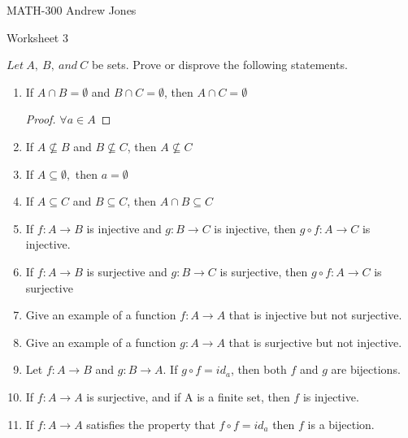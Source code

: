 \documentclass{article}
\begin{document}
  MATH-300 \hfill Andrew Jones
  \begin{center}
  {\huge Worksheet 3}
  \end{center}
  $Let\ A,\ B,\ and\ C$ be sets. Prove or disprove the following statements. \\
  \begin{enumerate}
  \item If $A\cap B = \emptyset$ and $B\cap C = \emptyset$, then $A\cap C = \emptyset$
    \begin{proof}
$\forall a\in A$
    \end{proof}
  \item If $A\not\subseteq B$ and $B\not\subseteq C$, then $A\not\subseteq C$ 
  \item If $A\subseteq \emptyset,$ then $a= \emptyset$ 
  \item If $A\subseteq C$ and $B\subseteq C$, then $A\cap B\subseteq C$
  \item If $f : A\to B$ is injective and $g : B\to C$ is injective, then $g \circ f : A\to C$ is injective. 
  \item If $f : A\to B$ is surjective and $g : B\to C$ is surjective, then $g \circ f : A\to C$ is surjective 
  \item Give an example of a function $f : A\to A$ that is injective but not surjective. 
  \item Give an example of a function $g : A\to A$ that is surjective but not injective. 
  \item Let $f : A\to B$ and $g : B\to A$. If $g \circ f = id_{a}$, then both $f$ and $g$ are bijections.
  \item If $f : A\to A$ is surjective, and if A is a finite set, then $f$ is injective.
  \item If $f : A\to A$ satisfies the property that $f \circ f = id_{a}$ then $f$ is a bijection.
  \end{enumerate}
\end{document}
